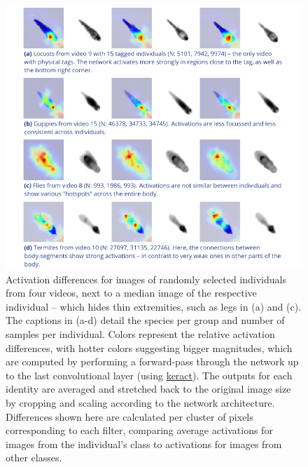 \documentclass[9pt,lineno]{elife}
\begin{document}
\begin{figure}[h]
\includegraphics[width=\textwidth]{figures/fig_activations.pdf}

\caption{\label{fig:network_activations}Activation differences for images of randomly selected individuals from four videos, next to a median image of the respective individual -- which hides thin extremities, such as legs in (a) and (c). The captions in (a-d) detail the species per group and number of samples per individual. Colors represent the relative activation differences, with hotter colors suggesting bigger magnitudes, which are computed by performing a forward-pass through the network up to the last convolutional layer (using \href{https://github.com/philipperemy/keract}{keract}). The outputs for each identity are averaged and stretched back to the original image size by cropping and scaling according to the network architecture. Differences shown here are calculated per cluster of pixels corresponding to each filter, comparing average activations for images from the individual's class to activations for images from other classes.}
\end{figure}
\end{document}
